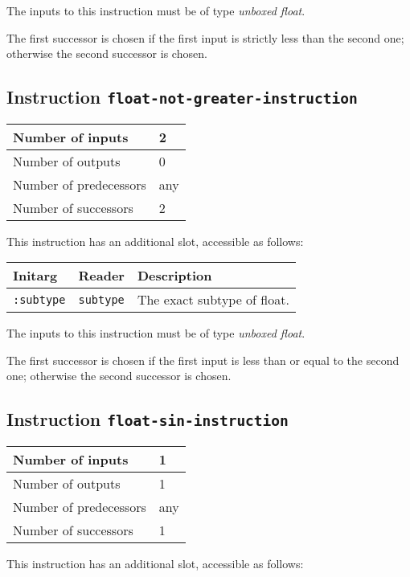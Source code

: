 The inputs to this instruction must be of type \emph{unboxed
  float}.

The first successor is chosen if the first input is strictly less than
the second one; otherwise the second successor is chosen. 

\subsection{Instruction \texttt{float-not-greater-instruction}}
\label{hir-instruction-float-not-greater}

\begin{tabular}{|l|l|}
\hline
Number of inputs & 2\\
\hline
Number of outputs & 0\\
\hline
Number of predecessors & any\\
\hline
Number of successors & 2\\
\hline
\end{tabular}

This instruction has an additional slot, accessible as follows:

\begin{tabular}{|l|l|l|}
  \hline
  Initarg & Reader & Description\\
  \hline\hline
  \texttt{:subtype} & \texttt{subtype} & The exact subtype of float.\\
  \hline
\end{tabular}

The inputs to this instruction must be of type \emph{unboxed
  float}.

The first successor is chosen if the first input is less than or equal
to the second one; otherwise the second successor is chosen.

\subsection{Instruction \texttt{float-sin-instruction}}
\label{hir-instruction-float-div}

\begin{tabular}{|l|l|}
\hline
Number of inputs & 1\\
\hline
Number of outputs & 1\\
\hline
Number of predecessors & any\\
\hline
Number of successors & 1\\
\hline
\end{tabular}

This instruction has an additional slot, accessible as follows:

